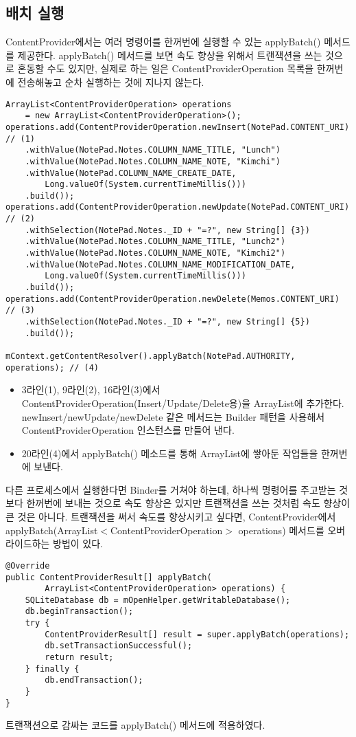 \subsection{배치 실행}
ContentProvider에서는 여러 명령어를 한꺼번에 실행할 수 있는 applyBatch() 메서드를  제공한다. 
applyBatch() 메서드를 보면 속도 향상을 위해서 트랜잭션을 쓰는 것으로 혼동할 수도 있지만, 실제로 하는 일은 ContentProviderOperation 목록을 한꺼번에 전송해놓고 순차 실행하는 것에 지나지 않는다. 
\begin{lstlisting}[frame=single] 
ArrayList<ContentProviderOperation> operations 
	= new ArrayList<ContentProviderOperation>();
operations.add(ContentProviderOperation.newInsert(NotePad.CONTENT_URI) // (1)
	.withValue(NotePad.Notes.COLUMN_NAME_TITLE, "Lunch")
	.withValue(NotePad.Notes.COLUMN_NAME_NOTE, "Kimchi")
	.withValue(NotePad.COLUMN_NAME_CREATE_DATE, 
		Long.valueOf(System.currentTimeMillis()))
	.build());
operations.add(ContentProviderOperation.newUpdate(NotePad.CONTENT_URI) // (2)
	.withSelection(NotePad.Notes._ID + "=?", new String[] {3})
	.withValue(NotePad.Notes.COLUMN_NAME_TITLE, "Lunch2")
	.withValue(NotePad.Notes.COLUMN_NAME_NOTE, "Kimchi2")
	.withValue(NotePad.Notes.COLUMN_NAME_MODIFICATION_DATE, 
		Long.valueOf(System.currentTimeMillis()))
	.build());
operations.add(ContentProviderOperation.newDelete(Memos.CONTENT_URI) // (3)
	.withSelection(NotePad.Notes._ID + "=?", new String[] {5})
	.build());

mContext.getContentResolver().applyBatch(NotePad.AUTHORITY, operations); // (4)
\end{lstlisting}
\begin{itemize}
\item 3라인(1), 9라인(2), 16라인(3)에서 ContentProviderOperation(Insert/Update/Delete용)을 ArrayList에 추가한다. 
newInsert/newUpdate/newDelete 같은 메서드는 Builder 패턴을 사용해서 ContentProviderOperation 인스턴스를 만들어 낸다.
\item 20라인(4)에서 applyBatch() 메소드를 통해 ArrayList에 쌓아둔 작업들을 한꺼번에 보낸다.
\end{itemize}

다른 프로세스에서 실행한다면 Binder를 거쳐야 하는데, 하나씩 명령어를 주고받는 것보다 한꺼번에 보내는 것으로 속도 향상은 있지만 트랜잭션을 쓰는 것처럼 속도 향상이 큰 것은 아니다.
트랜잭션을 써서 속도를 향상시키고 싶다면,
ContentProvider에서 applyBatch(ArrayList$<$ContentProviderOper\-ation$>$ operations) 메서드를 오버라이드하는 방법이 있다.
\begin{lstlisting}[frame=single] 
@Override
public ContentProviderResult[] applyBatch(
		ArrayList<ContentProviderOperation> operations) {
	SQLiteDatabase db = mOpenHelper.getWritableDatabase();
	db.beginTransaction();
	try {
     	ContentProviderResult[] result = super.applyBatch(operations);
     	db.setTransactionSuccessful();
     	return result;
   	} finally {
     	db.endTransaction();
   	}
}
\end{lstlisting}
트랜잭션으로 감싸는 코드를 applyBatch() 메서드에 적용하였다.

